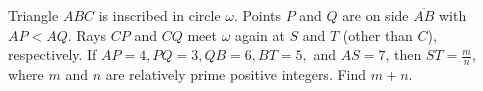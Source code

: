 Triangle $ABC$ is inscribed in circle $\omega$. Points $P$ and $Q$ are on side $\overline{AB}$ with $AP<AQ$. Rays $CP$ and $CQ$ meet $\omega$ again at $S$ and $T$ (other than $C$), respectively. If $AP=4,PQ=3,QB=6,BT=5,$ and $AS=7$,  then $ST=\frac{m}{n}$,  where $m$ and $n$ are relatively prime positive integers. Find $m+n$.